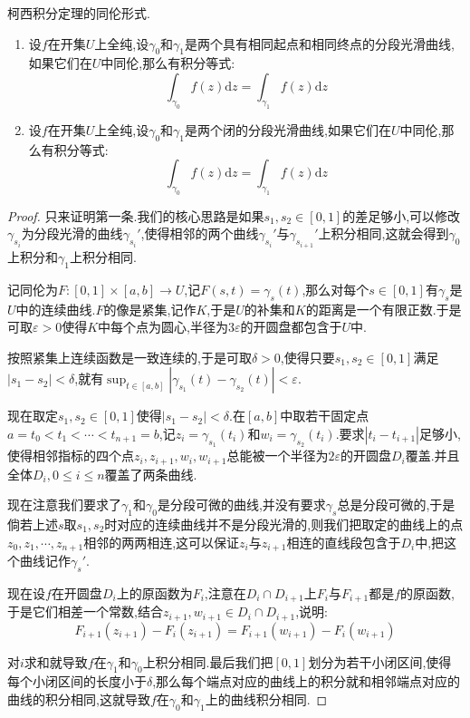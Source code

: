 柯西积分定理的同伦形式.
\begin{enumerate}
	\item 设$f$在开集$U$上全纯,设$\gamma_0$和$\gamma_1$是两个具有相同起点和相同终点的分段光滑曲线,如果它们在$U$中同伦,那么有积分等式:
	$$\int_{\gamma_0}f(z)\mathrm{d}z=\int_{\gamma_1}f(z)\mathrm{d}z$$
	\item 设$f$在开集$U$上全纯,设$\gamma_0$和$\gamma_1$是两个闭的分段光滑曲线,如果它们在$U$中同伦,那么有积分等式:
	$$\int_{\gamma_0}f(z)\mathrm{d}z=\int_{\gamma_1}f(z)\mathrm{d}z$$
\end{enumerate}
\begin{proof}
	
	只来证明第一条.我们的核心思路是如果$s_1,s_2\in[0,1]$的差足够小,可以修改$\gamma_{s_i}$为分段光滑的曲线$\gamma_{s_i}'$,使得相邻的两个曲线$\gamma_{s_i}'$与$\gamma_{s_{i+1}}'$上积分相同,这就会得到$\gamma_0$上积分和$\gamma_1$上积分相同.
	
	记同伦为$F:[0,1]\times[a,b]\to U$,记$F(s,t)=\gamma_s(t)$,那么对每个$s\in[0,1]$有$\gamma_s$是$U$中的连续曲线.$F$的像是紧集,记作$K$,于是$U$的补集和$K$的距离是一个有限正数.于是可取$\varepsilon>0$使得$K$中每个点为圆心,半径为$3\varepsilon$的开圆盘都包含于$U$中.
	
	按照紧集上连续函数是一致连续的,于是可取$\delta>0$,使得只要$s_1,s_2\in[0,1]$满足$|s_1-s_2|<\delta$,就有$\sup_{t\in[a,b]}\left|\gamma_{s_1}(t)-\gamma_{s_2}(t)\right|<\varepsilon$.
	
	现在取定$s_1,s_2\in[0,1]$使得$|s_1-s_2|<\delta$.在$[a,b]$中取若干固定点$a=t_0<t_1<\cdots<t_{n+1}=b$,记$z_i=\gamma_{s_1}(t_i)$和$w_i=\gamma_{s_2}(t_i)$.要求$|t_i-t_{i+1}|$足够小,使得相邻指标的四个点$z_i,z_{i+1},w_i,w_{i+1}$总能被一个半径为$2\varepsilon$的开圆盘$D_i$覆盖.并且全体$D_i,0\le i\le n$覆盖了两条曲线.
	
	现在注意我们要求了$\gamma_1$和$\gamma_0$是分段可微的曲线,并没有要求$\gamma_{s}$总是分段可微的,于是倘若上述$s$取$s_1,s_2$时对应的连续曲线并不是分段光滑的,则我们把取定的曲线上的点$z_0,z_1,\cdots,z_{n+1}$相邻的两两相连,这可以保证$z_i$与$z_{i+1}$相连的直线段包含于$D_i$中,把这个曲线记作$\gamma_s'$.
	
	现在设$f$在开圆盘$D_i$上的原函数为$F_i$,注意在$D_i\cap D_{i+1}$上$F_i$与$F_{i+1}$都是$f$的原函数,于是它们相差一个常数,结合$z_{i+1},w_{i+1}\in D_i\cap D_{i+1}$,说明:
	$$F_{i+1}(z_{i+1})-F_i(z_{i+1})=F_{i+1}(w_{i+1})-F_i(w_{i+1})$$
	
	对$i$求和就导致$f$在$\gamma_1$和$\gamma_0$上积分相同.最后我们把$[0,1]$划分为若干小闭区间,使得每个小闭区间的长度小于$\delta$,那么每个端点对应的曲线上的积分就和相邻端点对应的曲线的积分相同,这就导致$f$在$\gamma_0$和$\gamma_1$上的曲线积分相同.
\end{proof}

